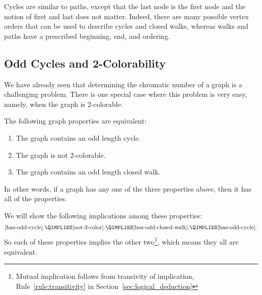 \begin{editingnotes}
Cycles are similar to paths, except that the last node is the first
node and the notion of first and last does not matter.  Indeed, there
are many possible vertex orders that can be used to describe cycles
and closed walks, whereas walks and paths have a prescribed beginning,
end, and ordering.
\end{editingnotes}

\subsection{Odd Cycles and 2-Colorability}\label{subsec:odd_cycles}

We have already seen that determining the chromatic number of a graph is a
challenging problem.  There is one special case where this problem is very
easy, namely, when the graph is 2-colorable.

\begin{theorem}\label{thm:2-colorable-equiv}
The following graph properties are equivalent:

\begin{enumerate}

\item\label{has-odd-cycle}
The graph contains an odd length cycle.

\item\label{not-2-color}
The graph is not 2-colorable.

\item\label{has-odd-closed-walk}
The graph contains an odd length closed walk.

\end{enumerate}
\end{theorem}
In other words, if a graph has any one of the three properties above, then
it has all of the properties.

We will show the following implications among these properties:
\[
\text{\ref{has-odd-cycle}.} \QIMPLIES \text{\ref{not-2-color}.} \QIMPLIES
\text{\ref{has-odd-closed-walk}.} \QIMPLIES
\text{\ref{has-odd-cycle}}.
\]
So each of these properties implies the other two\footnote{Mutual
  implication follows from transivity of implication,
  Rule~\ref{rule:transitivity} in Section~\ref{sec:logical_deduction}},
 which means they all are equivalent.

